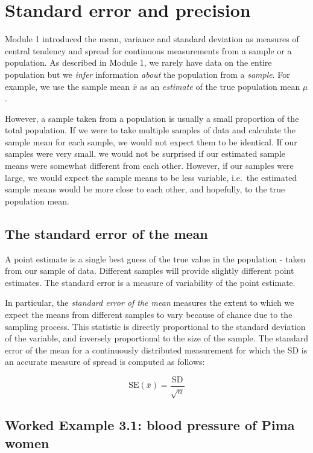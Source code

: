 \documentclass[
  a4paper,
]{memoir}
\begin{document}
\section{Standard error and
precision}\label{standard-error-and-precision}

Module 1 introduced the mean, variance and standard deviation as
measures of central tendency and spread for continuous measurements from
a sample or a population. As described in Module 1, we rarely have data
on the entire population but we \emph{infer} information \emph{about}
the population from a \emph{sample}. For example, we use the sample mean
\(\bar x\) as an \emph{estimate} of the true population mean \(\mu\).

However, a sample taken from a population is usually a small proportion
of the total population. If we were to take multiple samples of data and
calculate the sample mean for each sample, we would not expect them to
be identical. If our samples were very small, we would not be surprised
if our estimated sample means were somewhat different from each other.
However, if our samples were large, we would expect the sample means to
be less variable, i.e.~the estimated sample means would be more close to
each other, and hopefully, to the true population mean.

\subsection{The standard error of the mean}\label{sec-semean}

A point estimate is a single best guess of the true value in the
population - taken from our sample of data. Different samples will
provide slightly different point estimates. The standard error is a
measure of variability of the point estimate.

In particular, the \emph{standard error of the mean} measures the extent
to which we expect the means from different samples to vary because of
chance due to the sampling process. This statistic is directly
proportional to the standard deviation of the variable, and inversely
proportional to the size of the sample. The standard error of the mean
for a continuously distributed measurement for which the SD is an
accurate measure of spread is computed as follows:

\[ \text{SE}(\bar{x}) = \frac{\text{SD}}{\sqrt{n}} \]

\subsection{Worked Example 3.1: blood pressure of Pima
women}\label{worked-example-3.1-blood-pressure-of-pima-women}
\end{document}
